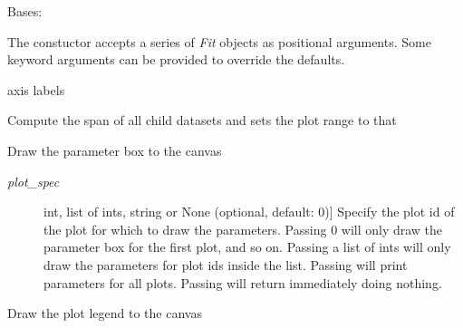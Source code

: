 \documentclass[a4paper,10pt,english]{sphinxmanual}
\begin{document}
\begin{fulllineitems}
\label{index:kafe.plot.Plot}
Bases: 

The constuctor accepts a series of \emph{Fit} objects as positional
arguments. Some keyword arguments can be provided to override
the defaults.

\begin{fulllineitems}
\label{index:kafe.plot.Plot.axis_labels}
axis labels

\end{fulllineitems}


\begin{fulllineitems}
\label{index:kafe.plot.Plot.compute_plot_range}
Compute the span of all child datasets and sets the plot range to that

\end{fulllineitems}


\begin{fulllineitems}
\label{index:kafe.plot.Plot.draw_fit_parameters_box}
Draw the parameter box to the canvas
\begin{description}
\item[{\emph{plot\_spec}}] \leavevmode{[}int, list of ints, string or None (optional, default: 0){]}
Specify the plot id of the plot for which to draw the parameters.
Passing 0 will only draw the parameter box for the first plot, and
so on. Passing a list of ints will only draw the parameters for
plot ids inside the list. Passing  will print parameters
for all plots. Passing  will return immediately doing
nothing.

\end{description}

\end{fulllineitems}


\begin{fulllineitems}
\label{index:kafe.plot.Plot.draw_legend}
Draw the plot legend to the canvas


\end{fulllineitems}
\end{fulllineitems}
\end{document}
